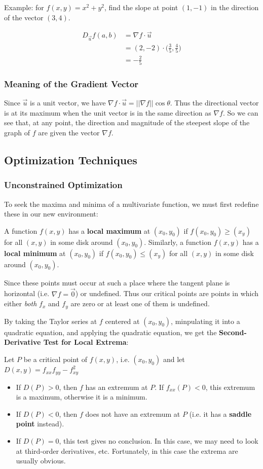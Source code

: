 \documentclass[12pt]{article}
\begin{document}
Example: for $f(x,y) = x^2 + y^2$, find the slope at point $(1,-1)$ in the direction of the vector $(3,4)$.

\begin{align*}
D_{\vec{u}} f(a,b) &= \nabla f \cdot \vec{u}\\
                   &= (2,-2) \cdot \bigl( \frac{3}{5}, \frac{4}{5} \bigl)\\
                   &= -\frac{2}{5}
\end{align*}

\subsubsection*{Meaning of the Gradient Vector}
Since $\vec{u}$ is a unit vector, we have $\nabla f \cdot \vec{u} = ||\nabla f|| \cos\theta$. Thus the directional vector is at its maximum when the unit vector is in the same direction as $\nabla f$. So we can see that, at any point, the direction and magnitude of the steepest slope of the graph of $f$ are given the vector $\nabla f$.

\subsection*{Optimization Techniques}
\subsubsection*{Unconstrained Optimization}
To seek the maxima and minima of a multivariate function, we must first redefine these in our new environment:

 A function $f(x,y)$ has a {\bf local maximum} at $(x_0, y_0)$ if $f(x_0, y_0) \geq (x_ y)$ for all $(x,y)$ in some disk around $(x_0,y_0)$. Similarly, a function $f(x,y)$ has a {\bf local minimum} at $(x_0, y_0)$ if $f(x_0, y_0) \leq (x_ y)$ for all $(x,y)$ in some disk around $(x_0,y_0)$.

Since these points must occur at such a place where the tangent plane is horizontal (i.e. $\nabla f = \vec{0}$) or undefined. Thus our critical points are points in which either \emph{both} $f_x$ and $f_y$ are zero or at least one of them is undefined.

By taking the Taylor series at $f$ centered at $(x_0,y_0)$, minpulating it into a quadratic equation, and applying the quadratic equation, we get the {\bf Second-Derivative Test for Local Extrema}:

Let $P$ be a critical point of $f(x,y)$, i.e. $(x_0,y_0)$ and let $D(x,y) = f_{xx}f_{yy} - f_{xy}^2$
\begin{itemize}
\item If $D(P) > 0$, then $f$ has an extremum at $P$. If $f_{xx}(P) < 0$, this extremum is a maximum, otherwise it is a minimum.
\item If $D(P) < 0$, then $f$ does not have an extremum at $P$ (i.e. it has a {\bf saddle point} instead).
\item If $D(P) = 0$, this test gives no conclusion. In this case, we may need to look at third-order derivatives, etc. Fortunately, in this case the extrema are usually obvious.
\end{itemize}
\end{document}

